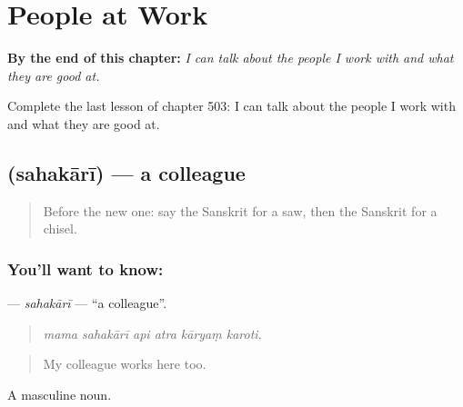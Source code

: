 
\chapter{People at Work}
\label{ch:sa-people-at-work}

\begin{chapteropening}
\textbf{By the end of this chapter:} \emph{I can talk about the people I work with and what they are good at.}

Complete the last lesson of chapter 503: I can talk about the people I work with and what they are good at.
\end{chapteropening}

\section[\texorpdfstring{\sk{सहकारी} (sahakārī)}{सहकारी (sahakārī)}]{ (sahakārī) — a colleague}

\label{lesson:SA-C503-sahakari}



\begin{quote}
Before the new one: say the Sanskrit for a saw, then the Sanskrit for a chisel.
\end{quote}

\subsection*{You'll want to know: }
\textbf{} — \emph{sahakārī} — \textquotedblleft{}a colleague\textquotedblright{}.

\begin{quote}
     
\end{quote}

\begin{quote}
\emph{mama sahakārī api atra kāryaṃ karoti.}
\end{quote}

\begin{quote}
My colleague works here too.
\end{quote}

A masculine noun.

